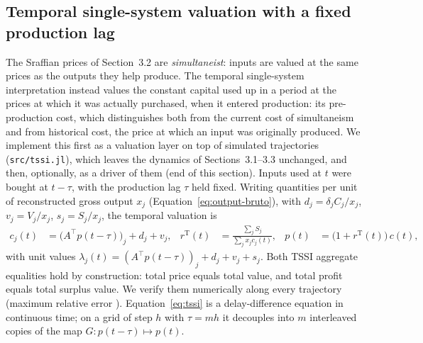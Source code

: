 \documentclass[11pt]{article}
\begin{document}
\subsection{Temporal single-system valuation with a fixed production lag}

The Sraffian prices of Section~3.2 are \emph{simultaneist}: inputs are
valued at the same prices as the outputs they help produce. The
temporal single-system interpretation \citep{freeman1996marx,kliman1999temporal}
instead values the constant capital used up in a period at the prices
at which it was actually purchased, when it entered production: its
pre-production cost, which \citet[ch.~6]{kliman2007reclaiming}
distinguishes both from the current cost of simultaneism and from
historical cost, the price at which an input was originally produced.
We implement this first as a
valuation layer on top of simulated trajectories (\texttt{src/tssi.jl}),
which leaves the dynamics of Sections~3.1--3.3 unchanged, and then,
optionally, as a driver of them (end of this section). Inputs used at $t$ were
bought at $t-\tau$, with the production lag $\tau$ held fixed. Writing
quantities per unit of reconstructed gross output $x_j$
(Equation~\eqref{eq:output-bruto}), with $d_j=\delta_jC_j/x_j$,
$v_j=V_j/x_j$, $s_j=S_j/x_j$, the temporal valuation is
\begin{align}
  c_j(t) &= \big(A^{\top}p(t-\tau)\big)_j + d_j + v_j, &
  r^{\mathrm{T}}(t) &= \frac{\sum_jS_j}{\sum_jx_jc_j(t)}, &
  p(t) &= \big(1+r^{\mathrm{T}}(t)\big)\,c(t), \label{eq:tssi}
\end{align}
with unit values $\lambda_j(t)=(A^{\top}p(t-\tau))_j+d_j+v_j+s_j$. Both
TSSI aggregate equalities hold by construction: total price equals
total value, and total profit equals total surplus value. We verify
them numerically along every trajectory (maximum relative error
\TssiInvErr). Equation~\eqref{eq:tssi} is a delay-difference equation
in continuous time; on a grid of step $h$ with $\tau=mh$ it decouples
into $m$ interleaved copies of the map $G:p(t-\tau)\mapsto p(t)$.
\end{document}
